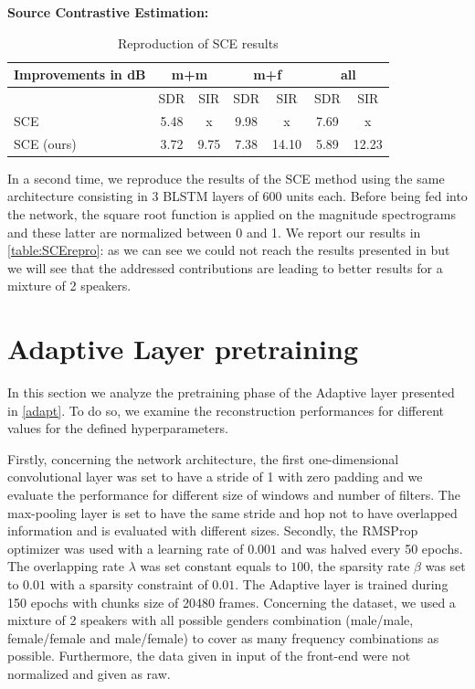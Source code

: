 \documentclass[master, tikz, final,11pt, dvipdfmx]{iscs-thesis}
\begin{document}
\textbf{Source Contrastive Estimation:} 

\begin{table}[ht]
\centering
\begin{tabular}{l|c|c|c|c|c|c}
Improvements in dB & \multicolumn{2}{c|}{m+m} & \multicolumn{2}{c|}{m+f} & \multicolumn{2}{c}{all} \\ 
\hline 
 & SDR & SIR & SDR & SIR & SDR & SIR \\ 
\hline 
SCE \cite{SCE} & 5.48 & x & 9.98 & x & 7.69 & x \\ 
SCE (ours) & 3.72 & 9.75 & 7.38 & 14.10 & 5.89 & 12.23 \\ 
\end{tabular}
\caption{Reproduction of SCE results}
\label{table:SCErepro}
\end{table}

In a second time, we reproduce the results of the SCE \cite{SCE} method using the same architecture consisting in 3 BLSTM layers of 600 units each. Before being fed into the network, the square root function is applied on the magnitude spectrograms and these latter are normalized between 0 and 1. We report our results in \autoref{table:SCErepro}: as we can see we could not reach the results presented in \cite{SCE} but we will see that the addressed contributions are leading to better results for a mixture of 2 speakers.

\section{Adaptive Layer pretraining}
\label{pre}
In this section we analyze the pretraining phase of the Adaptive layer presented in \autoref{adapt}. To do so, we examine the reconstruction performances for different values for the defined hyperparameters.

Firstly, concerning the network architecture, the first one-dimensional convolutional layer was set to have a stride of 1 with zero padding and we evaluate the performance for different size of windows and number of filters. The max-pooling layer is set to have the same stride and hop not to have overlapped information and is evaluated with different sizes. 
Secondly, the RMSProp optimizer was used with a learning rate of $0.001$ and was halved every 50 epochs. The overlapping rate $\lambda$ was set constant equals to $100$, the sparsity rate $\beta$ was set to $0.01$ with a sparsity constraint of $0.01$. 
The Adaptive layer is trained during 150 epochs with chunks size of 20480 frames.
Concerning the dataset, we used a mixture of 2 speakers with all possible genders combination (male/male, female/female and male/female) to cover as many frequency combinations as possible. Furthermore, the data given in input of the front-end were not normalized and given as raw. 
\end{document}
